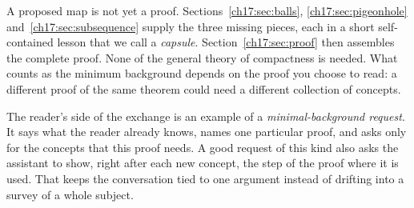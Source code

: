 A proposed map is not yet a proof. Sections~\ref{ch17:sec:balls}, \ref{ch17:sec:pigeonhole} and~\ref{ch17:sec:subsequence} supply the three missing pieces, each in a short self-contained lesson that we call a \emph{capsule}. Section~\ref{ch17:sec:proof} then assembles the complete proof. None of the general theory of compactness is needed. What counts as the minimum background depends on the proof you choose to read: a different proof of the same theorem could need a different collection of concepts.

The reader's side of the exchange is an example of a \emph{minimal-background request}. It says what the reader already knows, names one particular proof, and asks only for the concepts that this proof needs. A good request of this kind also asks the assistant to show, right after each new concept, the step of the proof where it is used. That keeps the conversation tied to one argument instead of drifting into a survey of a whole subject.
